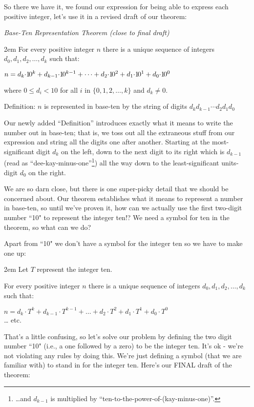 \documentclass{article}
\newenvironment{jprIn}{\begin{adjustwidth}{2em}{}}{\end{adjustwidth}}
\begin{document}
\break
So there we have it, we found our expression for being able to
express each positive integer, let's use
it in a revised draft of our theorem:

\emph{Base-Ten Representation Theorem (close to final draft)}
\begin{jprIn}
For every positive integer $n$ there is a unique sequence
of integers $d_0, d_1, d_2,\dots{},d_k$ such that:

\hspace{3em}$n=d_k{\cdot}{1\hspace{-0.12em}0}^k+d_{k-1}{\cdot}{1\hspace{-0.12em}0}^{k-1}+\dots+d_2{\cdot}{1\hspace{-0.12em}0}^2+d_1{\cdot}{1\hspace{-0.12em}0}^1+d_0{\cdot}{1\hspace{-0.12em}0}^0$

where $0\le{}d_i<10$ for all $i$ in $\{0,1,2,\dots{},k\}$ and $d_k\ne0$.

Definition: $n$ is represented in base-ten by the string of digits $d_kd_{k-1}{\cdots}d_2d_1d_0$
\end{jprIn}

Our newly added ``Definition'' introduces exactly what it means to write
the number out in base-ten; that is,
we toss out all the extraneous stuff from our expression
and string all the digits one after another.
Starting at the most-significant digit $d_k$ on the left,
down to the next digit to its right which is $d_{k-1}$
(read as ``dee-kay-minus-one''\footnote{\dots{}and $d_{k-1}$ is
multiplied by ``ten-to-the-power-of-(kay-minus-one)''.})
all the way down to the least-significant units-digit $d_0$ on the right.

We are so darn close, but there is one super-picky detail
that we should be concerned about.
Our theorem establishes what it means to represent a number in base-ten, so until
we've proven it, how can we actually use the first two-digit number ``10" to represent
the integer ten!? We need a symbol for ten in the theorem,
so what can we do?

Apart from ``10" we don't have a symbol for the integer ten so
we have to make one up:
\begin{jprIn}
Let $T$ represent the integer ten.

For every positive integer $n$ there is a unique sequence
of integers $d_0, d_1, d_2,\dots{},d_k$ such that:

\hspace{3em}$n=d_k{\cdot}{T}^k+d_{k-1}{\cdot}{T}^{k-1}+\dots+d_2{\cdot}{T}^2+d_1{\cdot}{T}^1+d_0{\cdot}{T}^0$\\
\dots{} etc.
\end{jprIn}
That's a little confusing, so 
let's solve our problem by defining the 
two digit number ``10" (i.e., a one followed by a zero) to be the integer ten.
It's ok - we're not violating any rules by doing this. We're just defining
a symbol (that we are familiar with) to stand in for the integer ten. Here's our
FINAL draft of the theorem:
\end{document}
